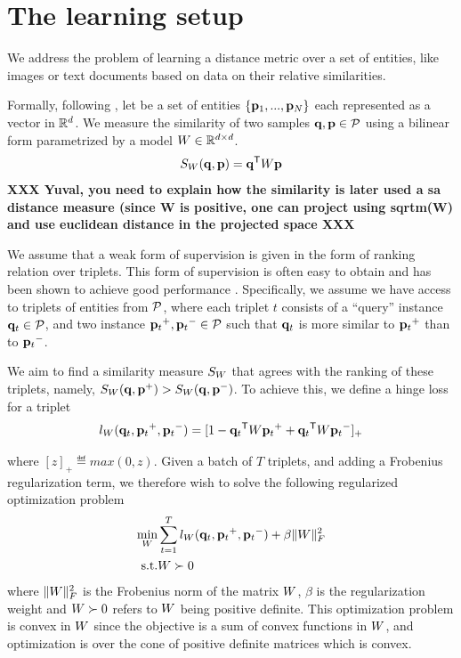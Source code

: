 \documentclass{article}
\begin{document}

\section{The learning setup}
We address the problem of learning a distance metric over a set of
entities, like images or text documents based on data on their
relative similarities.

Formally, following \cite{OASIS}, let  be a set of entities
$\{{\mathbf{p}}_1,...,{\mathbf{p}}_N\}$ each represented as a vector in $\mathbb{R}^d$.  We measure
the similarity of two samples ${\mathbf{q}}, {\mathbf{p}} \in \cal{P}$ using a bilinear
form parametrized by a model ${W} \in \mathbb{R}^{d \times d}$.
\begin{equation}
  S_{{W}}({\mathbf{q}}, {\mathbf{p}}) = {\mathbf{q}}{}^\mathsf{T} {W} {\mathbf{p}}
\end{equation}
\newline
{\bf{XXX Yuval, you need to explain how the similarity is later used a sa
distance measure (since W is positive, one can project using sqrtm(W)
and use euclidean distance in the projected space  XXX }}
\newline

We assume that a weak form of supervision is given in the form of
ranking relation over triplets. This form of supervision is often easy
to obtain and has been shown to achieve good performance
\cite{lmnn,oasis,qian}. Specifically, we assume we have access to
triplets of entities from $\cal{P}$, where each triplet $t$ consists of
a ``query'' instance ${{\mathbf{q}}_{{t}}} \in \cal{P}$, and two instance ${{\mathbf{p}}_{{t}}}^+,
{{\mathbf{p}}_{{t}}}^- \in \cal{P}$ such that ${{\mathbf{q}}_{{t}}}$ is more similar to ${{\mathbf{p}}_{{t}}}^+$
than to ${{\mathbf{p}}_{{t}}}^-$.

We aim to find a similarity measure $S_{{W}}$ that agrees with the
ranking of these triplets, namely, $S_{{W}}({\mathbf{q}}, {\mathbf{p}}^+) > S_{{W}}({\mathbf{q}},
{\mathbf{p}}^-)$. To achieve this, we define a hinge loss for a triplet
\begin{equation}
  l_{{W}}({{\mathbf{q}}_{{t}}}, {{\mathbf{p}}_{{t}}}^+, {{\mathbf{p}}_{{t}}}^-) = [1-{{\mathbf{q}}_{{t}}}{}^\mathsf{T}{W}{{\mathbf{p}}_{{t}}}^+ + {{\mathbf{q}}_{{t}}}{}^\mathsf{T}{W}{{\mathbf{p}}_{{t}}}^-]_{+}
  \label{single-triplet-hinge-loss}
\end{equation}

where $[z]_{+} \eqdef max(0,z)$.  Given a batch of $T$ triplets, and
adding a Frobenius regularization term, we therefore wish to solve the
following regularized optimization problem
\begin{eqnarray}
  \min_{{W}}& \sum_{{t}=1}^T  l_{{W}}({{\mathbf{q}}_{{t}}}, {{\mathbf{p}}_{{t}}}^+, {{\mathbf{p}}_{{t}}}^-) + \beta {\|{W}\|_F^2}
 \\  \nonumber
   \rm{s.t.}& {W} \succ 0
  \label{hingelt}
\end{eqnarray}
where ${\|{W}\|_F^2}$ is the Frobenius norm of the matrix ${W}$, $\beta$ is
the regularization weight and ${W} \succ 0$ refers to ${W}$ being
positive definite. This optimization problem is convex in ${W}$ since
the objective is a sum of convex functions in ${W}$, and optimization
is over the cone of positive definite matrices which is convex.
\end{document}
